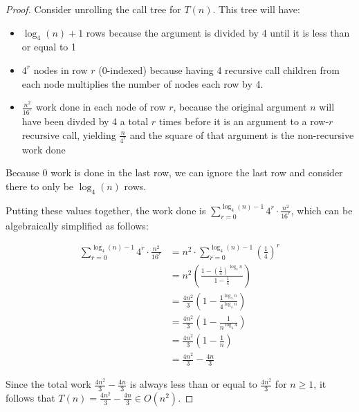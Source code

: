 \documentclass[10pt]{article}
\begin{document}
\begin{enumerate}[label={}]
            \begin{proof}
                  Consider unrolling the call tree for $T(n)$. This tree will have:
                  \begin{itemize}
                        \item $\log _4(n)+1$ rows because the argument is divided by 4 until it is less than or equal to 1
                        \item $4^r$ nodes in row $r$ (0-indexed) because having 4 recursive call children from each node multiplies the number of nodes each row by 4.
                        \item $\frac{n^2}{16^r}$ work done in each node of row $r$, because the original argument $n$ will have been divded by 4 a total $r$ times before it is an argument to a row-$r$ recursive call, yielding $\frac{n}{4^r}$ and the square of that argument is the non-recursive work done
                  \end{itemize}
                  Because 0 work is done in the last row, we can ignore the last row and consider there to only be $\log _4(n)$ rows.

                  Putting these values together, the work done is $\sum_{r=0}^{\log _4(n)-1} 4^r \cdot \frac{n^2}{16^r}$, which can be algebraically simplified as follows:

                  $$
                        \begin{aligned}
                              \sum_{r=0}^{\log _4(n)-1} 4^r \cdot \frac{n^2}{16^r} & =n^2 \cdot \sum_{r=0}^{\log _4(n)-1}\left(\frac{1}{4}\right)^r                \\
                                                                                   & =n^2\left(\frac{1-\left(\frac{1}{4}\right)^{\log _4 n}}{1-\frac{1}{4}}\right) \\
                                                                                   & =\frac{4 n^2}{3}\left(1-\frac{1^{\log _4 n}}{4^{\log _4 n}}\right)            \\
                                                                                   & =\frac{4 n^2}{3}\left(1-\frac{1}{n^{\log _4 4}}\right)                        \\
                                                                                   & =\frac{4 n^2}{3}\left(1-\frac{1}{n}\right)                                    \\
                                                                                   & =\frac{4 n^2}{3}-\frac{4 n}{3}
                        \end{aligned}
                  $$


                  Since the total work $\frac{4 n^2}{3}-\frac{4 n}{3}$ is always less than or equal to $\frac{4 n^2}{3}$ for $n \geq 1$, it follows that $T(n)=\frac{4 n^2}{3}-\frac{4 n}{3} \in O\left(n^2\right)$.

            \end{proof}

            \newpage

\end{enumerate}
\end{document}
